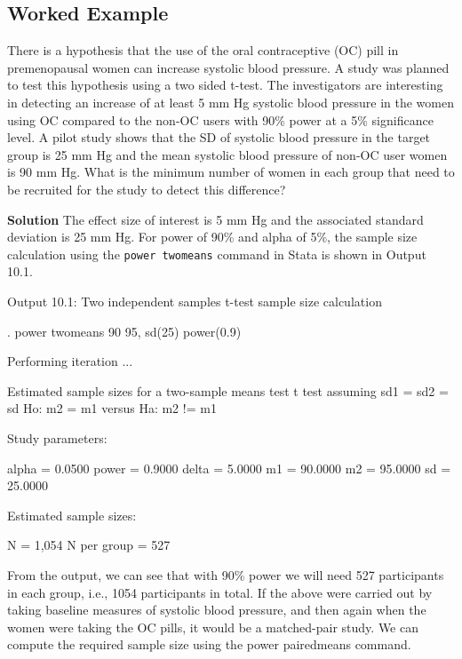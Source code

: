 \documentclass[
]{memoir}
\newenvironment{Shaded}{\begin{snugshade}}{\end{snugshade}}
\newcommand{\NormalTok}[1]{#1}
\begin{document}
\hypertarget{worked-example-15}{%
\subsection{Worked Example}\label{worked-example-15}}

There is a hypothesis that the use of the oral contraceptive (OC) pill in premenopausal women can increase systolic blood pressure. A study was planned to test this hypothesis using a two sided t-test. The investigators are interesting in detecting an increase of at least 5 mm Hg systolic blood pressure in the women using OC compared to the non-OC users with 90\% power at a 5\% significance level. A pilot study shows that the SD of systolic blood pressure in the target group is 25 mm Hg and the mean systolic blood pressure of non-OC user women is 90 mm Hg. What is the minimum number of women in each group that need to be recruited for the study to detect this difference?

\textbf{Solution}
The effect size of interest is 5 mm Hg and the associated standard deviation is 25 mm Hg. For power of 90\% and alpha of 5\%, the sample size calculation using the \texttt{power\ twomeans} command in Stata is shown in Output 10.1.

Output 10.1: Two independent samples t-test sample size calculation

\begin{Shaded}
\begin{Highlighting}[]
\NormalTok{. power twomeans 90 95, sd(25) power(0.9)}

\NormalTok{Performing iteration ...}

\NormalTok{Estimated sample sizes for a two{-}sample means test}
\NormalTok{t test assuming sd1 = sd2 = sd}
\NormalTok{Ho: m2 = m1 versus  Ha: m2 != m1}

\NormalTok{Study parameters:}

\NormalTok{        alpha =    0.0500}
\NormalTok{        power =    0.9000}
\NormalTok{        delta =    5.0000}
\NormalTok{           m1 =   90.0000}
\NormalTok{           m2 =   95.0000}
\NormalTok{           sd =   25.0000}

\NormalTok{Estimated sample sizes:}

\NormalTok{            N =     1,054}
\NormalTok{  N per group =       527}
\end{Highlighting}
\end{Shaded}

From the output, we can see that with 90\% power we will need 527 participants in each group, i.e., 1054 participants in total.
If the above were carried out by taking baseline measures of systolic blood pressure, and then again when the women were taking the OC pills, it would be a matched-pair study. We can compute the required sample size using the power pairedmeans command.
\end{document}
